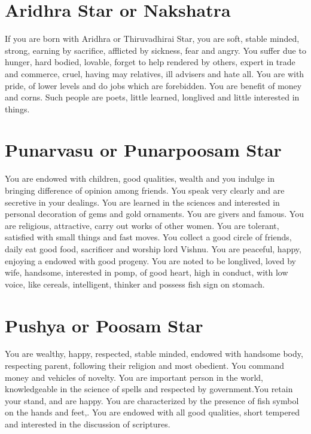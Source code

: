 \documentclass[12pt, right open]{memoir}
\begin{document}
\section{Aridhra Star or Nakshatra}

If you are born with Aridhra or Thiruvadhirai Star, you are soft, stable minded, strong, earning by sacrifice, afflicted by sickness, fear and angry. You suffer due to hunger, hard bodied, lovable, forget to help rendered by others, expert in trade and commerce, cruel, having may relatives, ill advisers and hate all. You are with pride, of lower levels and do jobs which are forebidden. You are benefit of money and corns. Such people are poets, little learned, longlived and little interested in things.


\section{Punarvasu or Punarpoosam Star}

You are endowed with children, good qualities, wealth and you indulge in bringing difference of opinion among friends. You speak very clearly and are secretive in your dealings. You are learned in the sciences and interested in personal decoration of gems and gold ornaments. You are givers and famous. You are religious, attractive, carry out works of other women. You are tolerant, satisfied with small things and fast moves. You collect a good circle of friends, daily eat good food, sacrificer and worship lord Vishnu. You are peaceful, happy, enjoying a endowed with good progeny. You are noted to be longlived, loved by wife, handsome, interested in pomp, of good heart, high in conduct, with low voice, like cereals, intelligent, thinker and possess fish sign on stomach.


\section{Pushya or Poosam Star}

You are wealthy, happy, respected, stable minded, endowed with handsome body, respecting parent, following their religion and most obedient. You command money and vehicles of novelty. You are important person in the world, knowledgeable in the science of spells and respected by government.You retain your stand, and are happy. You are characterized by the presence of fish symbol on the hands and feet,. You are endowed with all good qualities, short tempered and interested in the discussion of scriptures.
\end{document}
